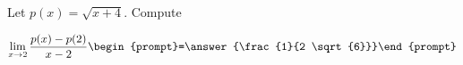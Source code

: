 \documentclass{ximera}
\author{Bart Snapp}
\begin{document}
\begin{exercise}
Let $p(x) = \sqrt{x+4}$. Compute

\[
\lim_{ x\to 2 } 
\frac{p(x)-p(2)}{x-2} \begin{prompt}=\answer{\frac{1}{2 \sqrt{6}}}\end{prompt}
\]
\end{exercise}
\end{document}
